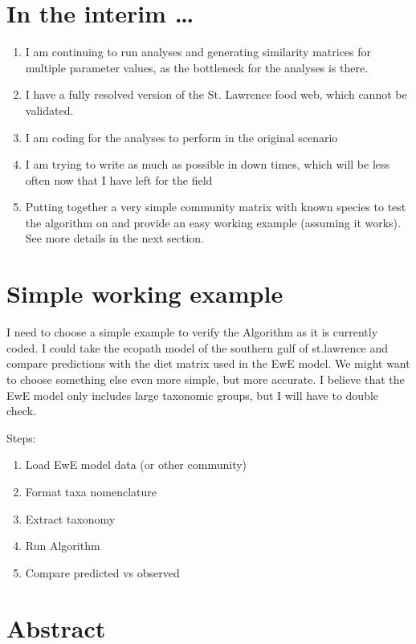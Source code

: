 \documentclass[letterpaper]{article}
\begin{document}
\section{In the interim \dots}
\begin{enumerate}
  \item I am continuing to run analyses and generating similarity matrices for multiple parameter values, as the bottleneck for the analyses is there.
  \item I have a fully resolved version of the St. Lawrence food web, which cannot be validated.
  \item I am coding for the analyses to perform in the original scenario
  \item I am trying to write as much as possible in down times, which will be less often now that I have left for the field
  \item Putting together a very simple community matrix with known species to test the algorithm on and provide an easy working example (assuming it works). See more details in the next section.
\end{enumerate}

\section{Simple working example}
I need to choose a simple example to verify the Algorithm as it is currently coded. I could take the ecopath model of the southern gulf of st.lawrence and compare predictions with the diet matrix used in the EwE model. We might want to choose something else even more simple, but more accurate. I believe that the EwE model only includes large taxonomic groups, but I will have to double check.

Steps:
 \begin{enumerate}
   \item Load EwE model data (or other community)
   \item Format taxa nomenclature
   \item Extract taxonomy
   \item Run Algorithm
   \item Compare predicted vs observed
 \end{enumerate}



\newpage
\section{Abstract}
\end{document}
